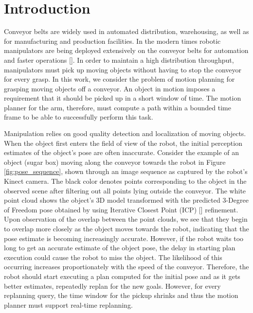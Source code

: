 \documentclass[conference]{IEEEtran}
\begin{document}
\IEEEpeerreviewmaketitle

\section{Introduction}

Conveyor belts are widely used in automated distribution, warehousing, as well as for manufacturing and production facilities. In the modern times robotic manipulators are being deployed extensively on the conveyor belts for automation and faster operations []. In order to maintain a high distribution throughput, manipulators must pick up moving objects without having to stop the conveyor for every grasp. In this work, we consider the problem of motion planning for grasping moving objects off a conveyor. An object in motion imposes a requirement that it should be picked up in a short window of time. The motion planner for the arm, therefore, must compute a path within a bounded time frame to be able to successfully perform this task.

Manipulation relies on good quality detection and localization of moving objects. When the object first enters the field of view of the robot, the initial perception estimates of the object's pose are often inaccurate. Consider the example of an object (sugar box) moving along the conveyor towards the robot in Figure \ref{fig:pose_sequence}, shown through an image sequence as captured by the robot's Kinect camera. The black color denotes points corresponding to the object in the observed scene after filtering out all points lying outside the conveyor. The white point cloud shows the object's 3D model transformed with the predicted 3-Degree of Freedom pose obtained by using Iterative Closest Point (ICP) [] refinement. Upon observation of the overlap between the point clouds, we see that they begin to overlap more closely as the object moves towards the robot, indicating that the pose estimate is becoming increasingly accurate. However, if the robot waits too long to get an accurate estimate of the object pose, the delay in starting plan execution could cause the robot to miss the object. The likelihood of this occurring increases proportionately with the speed of the conveyor. Therefore, the robot should start executing a plan computed for the initial pose and as it gets better estimates, repeatedly replan for the new goals. However, for every replanning query, the time window for the pickup shrinks and thus the motion planner must support real-time replanning.
\end{document}
